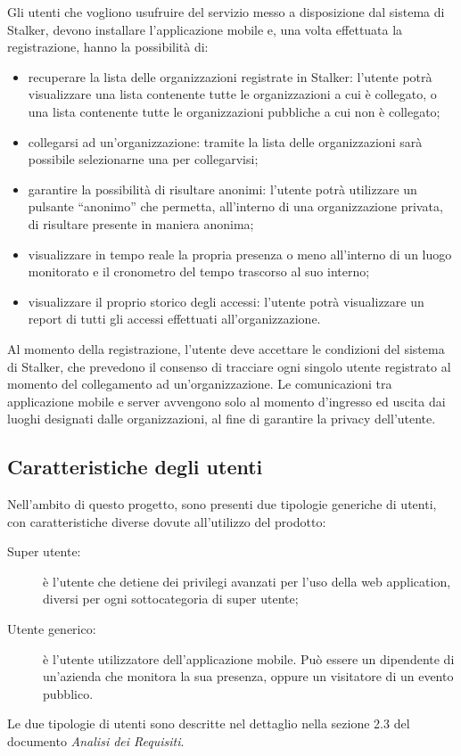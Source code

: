 \documentclass[../manuale-utente.tex]{subfiles}
\begin{document}
Gli utenti che vogliono usufruire del servizio messo a disposizione dal sistema di Stalker, devono installare l'applicazione mobile e, una volta effettuata la registrazione, hanno la possibilità di:
\begin{itemize}
  \item recuperare la lista delle organizzazioni registrate in Stalker: l'utente potrà visualizzare una lista contenente tutte le organizzazioni a cui è collegato, o una lista contenente tutte le organizzazioni pubbliche a cui non è collegato;
  \item collegarsi ad un'organizzazione: tramite la lista delle organizzazioni sarà possibile selezionarne una per collegarvisi;
  \item garantire la possibilità di risultare anonimi: l'utente potrà utilizzare un pulsante “anonimo” che permetta, all'interno di una organizzazione privata, di risultare presente in maniera anonima;
  \item visualizzare in tempo reale la propria presenza o meno all'interno di un luogo monitorato e il cronometro del tempo trascorso al suo interno;
  \item visualizzare il proprio storico degli accessi: l'utente potrà visualizzare un report di tutti gli accessi effettuati all'organizzazione.

\end{itemize}
Al momento della registrazione, l'utente deve accettare le condizioni del sistema di Stalker, che prevedono il consenso di tracciare ogni singolo utente registrato al momento del collegamento ad un'organizzazione.
Le comunicazioni tra applicazione mobile e server avvengono solo al momento d'ingresso ed uscita dai luoghi designati dalle organizzazioni, al fine di garantire la privacy dell'utente.


\subsection{Caratteristiche degli utenti}%
\label{sub:caratteristiche_degli_utenti}
Nell'ambito di questo progetto, sono presenti due tipologie generiche di utenti, con caratteristiche diverse dovute all'utilizzo del prodotto:
\begin{description}
  \item[Super utente:] è l'utente che detiene dei privilegi avanzati per l'uso della web application, diversi per ogni sottocategoria di super utente;
  \item[Utente generico:] è l'utente utilizzatore dell'applicazione mobile. Può essere un dipendente di un'azienda che monitora la sua presenza, oppure un visitatore di un evento pubblico.
\end{description}
Le due tipologie di utenti sono descritte nel dettaglio nella sezione 2.3 del documento \textit{Analisi dei Requisiti}.
\end{document}
